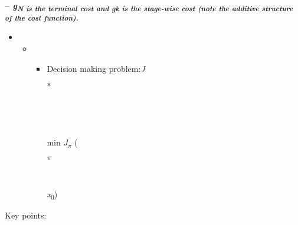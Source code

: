 \documentclass[12pt,twoside]{article}
\begin{document}
\vspace{\baselineskip}
{\fontsize{10pt}{12.0pt}\selectfont \textbf{– \textit{g\textsubscript{N is the terminal cost and gk is the stage-wise cost (note the additive structure of the cost function).}}}\par}\par


\vspace{\baselineskip}
\begin{itemize}
	\item \begin{itemize}
	\item \begin{itemize}
	\item {\fontsize{10pt}{12.0pt}\selectfont Decision making problem:\tab \textit{J}{\fontsize{7pt}{8.4pt}\selectfont $\ast$ \par}\par}\par

\\

\par

\\

\vspace{\baselineskip}\begin{FlushLeft}
{\fontsize{10pt}{12.0pt}\selectfont min \textit{J\textsubscript{$ \pi $ } }(\par}
\end{FlushLeft}\par

\begin{FlushLeft}
{\fontsize{7pt}{8.4pt}\selectfont \textit{$ \pi $ }\par}
\end{FlushLeft}\par

\\

\vspace{\baselineskip}\begin{FlushLeft}
{\fontsize{10pt}{12.0pt}\selectfont \textit{x}\textsubscript{0})\par}
\end{FlushLeft}\par


\vspace{\baselineskip}

\end{itemize}
\end{itemize}
\end{itemize}
\vspace{\baselineskip}
{\fontsize{10pt}{12.0pt}\selectfont Key points:\par}\par
\end{document}
